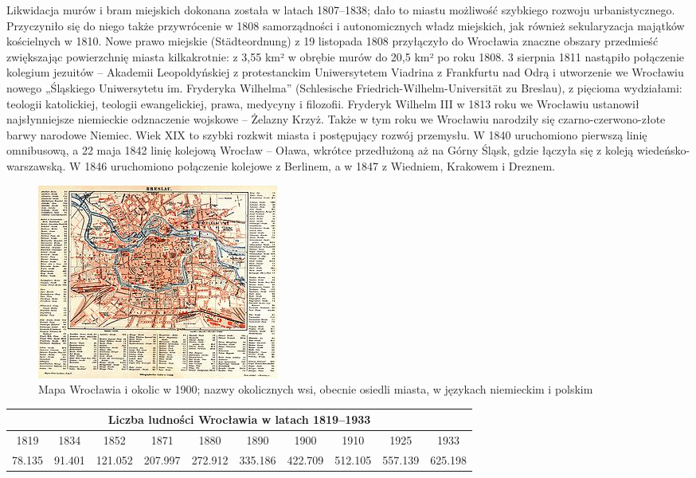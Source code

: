 \documentclass{article}
\begin{document}
Likwidacja murów i bram miejskich dokonana została w latach 1807–1838; dało to miastu możliwość szybkiego rozwoju urbanistycznego. Przyczyniło się do niego także przywrócenie w 1808 samorządności i autonomicznych władz miejskich, jak również sekularyzacja majątków kościelnych w 1810. Nowe prawo miejskie (Städteordnung) z 19 listopada 1808 przyłączyło do Wrocławia znaczne obszary przedmieść zwiększając powierzchnię miasta kilkakrotnie: z 3,55 km² w obrębie murów do 20,5 km² po roku 1808. 3 sierpnia 1811 nastąpiło połączenie kolegium jezuitów – Akademii Leopoldyńskiej z protestanckim Uniwersytetem Viadrina z Frankfurtu nad Odrą i utworzenie we Wrocławiu nowego „Śląskiego Uniwersytetu im. Fryderyka Wilhelma” (Schlesische Friedrich-Wilhelm-Universität zu Breslau), z pięcioma wydziałami: teologii katolickiej, teologii ewangelickiej, prawa, medycyny i filozofii. Fryderyk Wilhelm III w 1813 roku we Wrocławiu ustanowił najsłynniejsze niemieckie odznaczenie wojskowe – Żelazny Krzyż. Także w tym roku we Wrocławiu narodziły się czarno-czerwono-złote barwy narodowe Niemiec. Wiek XIX to szybki rozkwit miasta i postępujący rozwój przemysłu. W 1840 uruchomiono pierwszą linię omnibusową, a 22 maja 1842 linię kolejową Wrocław – Oława, wkrótce przedłużoną aż na Górny Śląsk, gdzie łączyła się z koleją wiedeńsko-warszawską. W 1846 uruchomiono połączenie kolejowe z Berlinem, a w 1847 z Wiedniem, Krakowem i Dreznem.

\begin{figure}[htbp!]
\centering
\includegraphics[scale=3.6]{8.jpg}
\caption{Mapa Wrocławia i okolic w 1900;
nazwy okolicznych wsi, obecnie osiedli miasta, w językach niemieckim i polskim}
\label{fig:7}
\end{figure}

\begin{center}
\begin{tabular}{ |c|c|c|c|c|c|c|c|c|c|}
\hline
\multicolumn{10}{|c|}{Liczba ludności Wrocławia w latach 1819–1933} \\
\hline
 1819 & 1834 & 1852 & 1871 & 1880 & 1890 & 1900 & 1910 & 1925 & 1933 \\
\hline
 78.135 & 91.401 & 121.052 & 207.997 & 272.912 & 335.186 & 422.709 & 512.105 & 557.139 & 625.198 \\
\hline
\end{tabular}
\end{center}
\end{document}
